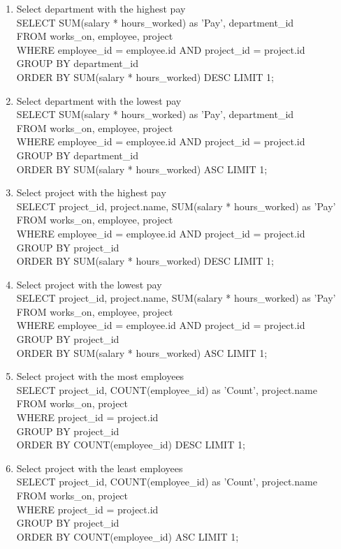 \documentclass[fleqn, 11pt,letterpaper]{article}
\begin{document}
\begin{enumerate}
		\item Select department with the highest pay \\SELECT SUM(salary * hours\_worked) as 'Pay', department\_id \\FROM works\_on, employee, project \\WHERE employee\_id = employee.id AND project\_id = project.id \\GROUP BY department\_id \\ORDER BY SUM(salary * hours\_worked) DESC LIMIT 1;
		\item Select department with the lowest pay \\SELECT SUM(salary * hours\_worked) as 'Pay', department\_id \\FROM works\_on, employee, project \\WHERE employee\_id = employee.id AND project\_id = project.id \\GROUP BY department\_id \\ORDER BY SUM(salary * hours\_worked) ASC LIMIT 1;
		\item Select project with the highest pay \\SELECT project\_id, project.name, SUM(salary * hours\_worked) as 'Pay' \\FROM works\_on, employee, project \\WHERE employee\_id = employee.id AND project\_id = project.id \\GROUP BY project\_id \\ORDER BY SUM(salary * hours\_worked) DESC LIMIT 1;
		\item Select project with the lowest pay \\SELECT project\_id, project.name, SUM(salary * hours\_worked) as 'Pay' \\FROM works\_on, employee, project \\WHERE employee\_id = employee.id AND project\_id = project.id \\GROUP BY project\_id \\ORDER BY SUM(salary * hours\_worked) ASC LIMIT 1;
		\item Select project with the most employees \\SELECT project\_id, COUNT(employee\_id) as 'Count', project.name \\FROM works\_on, project \\WHERE project\_id = project.id \\GROUP BY project\_id \\ORDER BY COUNT(employee\_id) DESC LIMIT 1;
		\item Select project with the least employees \\SELECT project\_id, COUNT(employee\_id) as 'Count', project.name \\FROM works\_on, project \\WHERE project\_id = project.id \\GROUP BY project\_id \\ORDER BY COUNT(employee\_id) ASC LIMIT 1;

\end{enumerate}
\end{document}
